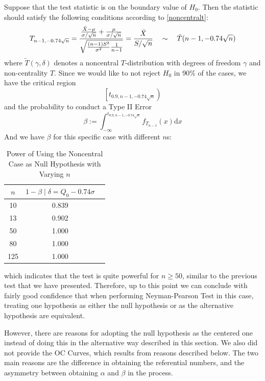 \documentclass[12pt]{article}
\def\d{\mathrm{d}}
\begin{document}
Suppose that the test statistic is on the boundary value of $H_0$. Then the statistic should satisfy the following conditions according to \eqref{noncentralt}:
$$
T_{n-1,-0.74\sqrt{n}}=\frac{\frac{\Bar{X}-\mu}{\sigma/\sqrt{n}}+\frac{\mu}{\sigma/\sqrt{n}}}{\sqrt{\frac{(n-1)S^2}{\sigma^2}\frac{1}{n-1}}}=\frac{\Bar{X}}{S/\sqrt{n}}\quad\sim\quad \tilde{T}(n-1,-0.74\sqrt{n})
$$
where $\tilde{T}(\gamma, \delta)$ denotes a noncentral $T$-distribution with degrees of freedom $\gamma$ and non-centrality $T$. Since we would like to not reject $H_0$ in 90\% of the cases, we have the critical region
$$
\left[t_{0.9,n-1,-0.74\sqrt{n}}\right)
$$
and the probability to conduct a Type II Error
$$
\beta := \int_{-\infty}^{t_{0.9,n-1,-0.74\sqrt{n}}}f_{T_{n-1}}(x) \d x
$$ 
And we have $\beta$ for this specific case with different $n$s:

\begin{table}[htbp]
    \centering
    \begin{tabular}{ccc}
        \toprule
        $n$ & $1-\beta\mid\delta = Q_0 - 0.74\sigma$ \\
        \midrule
        10 & 0.839 \\
        13 & 0.902 \\
        50 & 1.000 \\
        80 & 1.000 \\
        125 & 1.000 \\
        \bottomrule
    \end{tabular}
    \caption{Power of Using the Noncentral Case as Null Hypothesis with Varying $n$}
\end{table}

\noindent which indicates that the test is quite powerful for $n\geq 50$, similar to the previous test that we have presented. Therefore, up to this point we can conclude with fairly good confidence that when performing Neyman-Pearson Test in this case, treating one hypothesis as either the null hypothesis or as the alternative hypothesis are equivalent.

However, there are reasons for adopting the null hypothesis as the centered one instead of doing this in the alternative way described in this section. We also did not provide the OC Curves, which results from reasons described below. The two main reasons are the difference in obtaining the referential numbers, and the asymmetry between obtaining $\alpha$ and $\beta$ in the process. 
\end{document}
